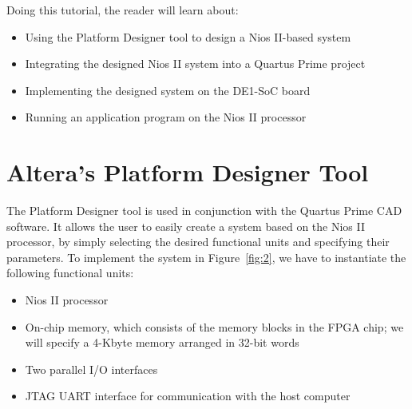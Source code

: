 \documentclass[11pt, twoside, pdftex]{article}
\begin{document}
Doing this tutorial, the reader will learn about:
\begin{itemize}
\item Using the Platform Designer tool to design a Nios II-based system
\item Integrating the designed Nios II system into a Quartus Prime project
\item Implementing the designed system on the DE1-SoC board
\item Running an application program on the Nios II processor
\end{itemize}

\section{Altera's Platform Designer Tool}

The Platform Designer tool is used in conjunction with the Quartus Prime CAD software.
It allows the user to easily create a system based on the Nios II processor, by simply
selecting the desired functional units and specifying their parameters.
To implement the system in Figure~\ref{fig:2}, we have to instantiate the following functional
units:
\begin{itemize}
\item Nios II processor
\item On-chip memory, which consists of the memory blocks in the FPGA chip;
we will specify a 4-Kbyte memory arranged in 32-bit words
\item Two parallel I/O interfaces
\item JTAG UART interface for communication with the host computer
\end{itemize}
\end{document}

